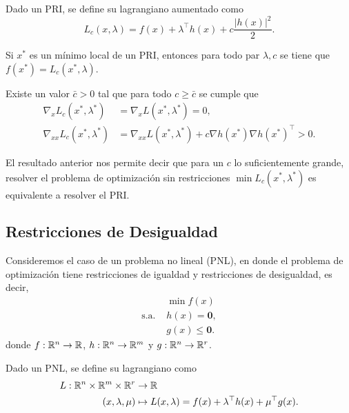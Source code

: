 \begin{definition}
	Dado un PRI, se define su lagrangiano aumentado como
	\[L_{c}(x, \lambda) = f(x) + \lambda^{\top} h(x) + c \frac{\lvert h(x)\rvert^2}{2}.\]
\end{definition}

\begin{proposition}
	Si \(x^{\ast}\) es un mínimo local de un PRI, entonces para todo par \(\lambda, c\) se tiene que \(f(x^{\ast}) = L_{c}(x^{\ast}, \lambda)\).
\end{proposition}

\begin{proposition}
	Existe un valor \(\bar{c} > 0\) tal que para todo \(c \geq \bar{c}\) se cumple que
	\begin{align*}
		\nabla_{x} L_{c}(x^{\ast}, \lambda^{\ast})	&= \nabla_{x} L(x^{\ast}, \lambda^{\ast}) = 0,\\
		\nabla_{xx} L_{c}(x^{\ast}, \lambda^{\ast})	&= \nabla_{xx}L(x^{\ast}, \lambda^{\ast}) + c\nabla h(x^{\ast}) \nabla h(x^{\ast})^{\top} > 0.
	\end{align*}
\end{proposition}
El resultado anterior nos permite decir que para un \(c\) lo suficientemente grande, resolver el problema de optimización sin restricciones \(\min L_{c}(x^{\ast}, \lambda^{\ast})\) es equivalente a resolver el PRI.

\subsection{Restricciones de Desigualdad}

Consideremos el caso de un problema no lineal (PNL), en donde el problema de optimización tiene restricciones de igualdad y restricciones de desigualdad, es decir,
\begin{align*}
					&\min f(x) \\
	\text{s.a. }	& h(x) = \mathbf{0}, \\
					& g(x) \leq \mathbf{0}.
\end{align*}
donde \(f : \mathbb{R}^n \to \mathbb{R}\), \(h : \mathbb{R}^n \to \mathbb{R}^m\) y \(g : \mathbb{R}^n \to \mathbb{R}^r\).

\begin{definition}
	Dado un PNL, se define su lagrangiano como
	\begin{align*}
		L : \mathbb{R}^n \times \mathbb{R}^m \times \mathbb{R}^r	&\to \mathbb{R}\\
		(x, \lambda, \mu)								&\mapsto L(x, \lambda) = f(x) + \lambda^{\top} h(x) + \mu^{\top} g(x).
	\end{align*}
\end{definition}

